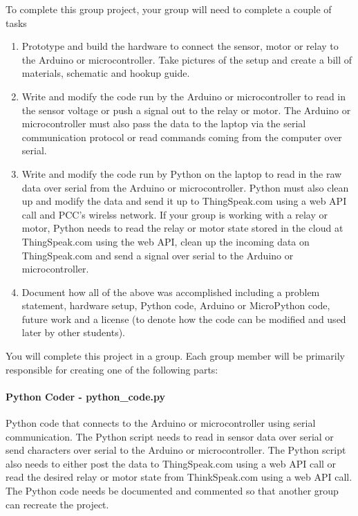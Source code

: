 \documentclass[11pt]{article}
\providecommand{\tightlist}{%
      \setlength{\itemsep}{0pt}\setlength{\parskip}{0pt}}
\begin{document}
    To complete this group project, your group will need to complete a
couple of tasks

\begin{enumerate}
\def\labelenumi{\arabic{enumi}.}
\tightlist
\item
  Prototype and build the hardware to connect the sensor, motor or relay
  to the Arduino or microcontroller. Take pictures of the setup and
  create a bill of materials, schematic and hookup guide.
\item
  Write and modify the code run by the Arduino or microcontroller to
  read in the sensor voltage or push a signal out to the relay or motor.
  The Arduino or microcontroller must also pass the data to the laptop
  via the serial communication protocol or read commands coming from the
  computer over serial.
\item
  Write and modify the code run by Python on the laptop to read in the
  raw data over serial from the Arduino or microcontroller. Python must
  also clean up and modify the data and send it up to ThingSpeak.com
  using a web API call and PCC's wirelss network. If your group is
  working with a relay or motor, Python needs to read the relay or motor
  state stored in the cloud at ThingSpeak.com using the web API, clean
  up the incoming data on ThingSpeak.com and send a signal over serial
  to the Arduino or microcontroller.
\item
  Document how all of the above was accomplished including a problem
  statement, hardware setup, Python code, Arduino or MicroPython code,
  future work and a license (to denote how the code can be modified and
  used later by other students).
\end{enumerate}

    You will complete this project in a group. Each group member will be
primarily responsible for creating one of the following parts:

\hypertarget{python-coder---python_code.py}{%
\paragraph{Python Coder -
python\_code.py}\label{python-coder---python_code.py}}

Python code that connects to the Arduino or microcontroller using serial
communication. The Python script needs to read in sensor data over
serial or send characters over serial to the Arduino or microcontroller.
The Python script also needs to either post the data to ThingSpeak.com
using a web API call or read the desired relay or motor state from
ThinkSpeak.com using a web API call. The Python code needs be documented
and commented so that another group can recreate the project.
\end{document}
